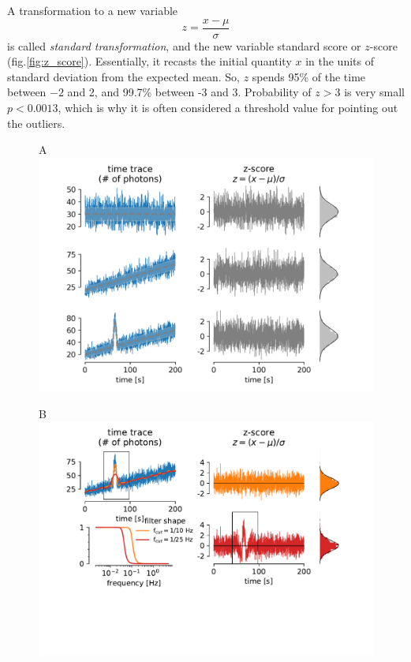 \documentclass[a4paper,11pt,]{article}
\begin{document}
A transformation to a new variable %
$$z=\frac{x-\mu}{\sigma}$$
is called {\it standard transformation}, and the new variable standard score or $z$-score (fig.\ref{fig:z_score}). Essentially, it recasts the initial quantity $x$ in the units of standard deviation from the expected mean. So, $z$ spends 95\% of the time between $-2$ and 2, and 99.7\% between -3 and 3. Probability of $z>3$ is very small $p<0.0013$, which is why it is often considered a threshold value for pointing out the outliers.
\begin{figure}[t]
    \centering
    \begin{minipage}{.49\textwidth}
        {\selectfont A} \includegraphics[scale=.5,trim=15mm 0 0 0,clip,align=t]{figures/z_score_1.png}
    \end{minipage}
    \begin{minipage}{.49\textwidth} 
        {\selectfont B} \includegraphics[scale=.5,trim=15mm 30mm 0 0,clip,align=t]{figures/z_score_2.pdf}

\end{minipage}
\end{figure}
\end{document}
